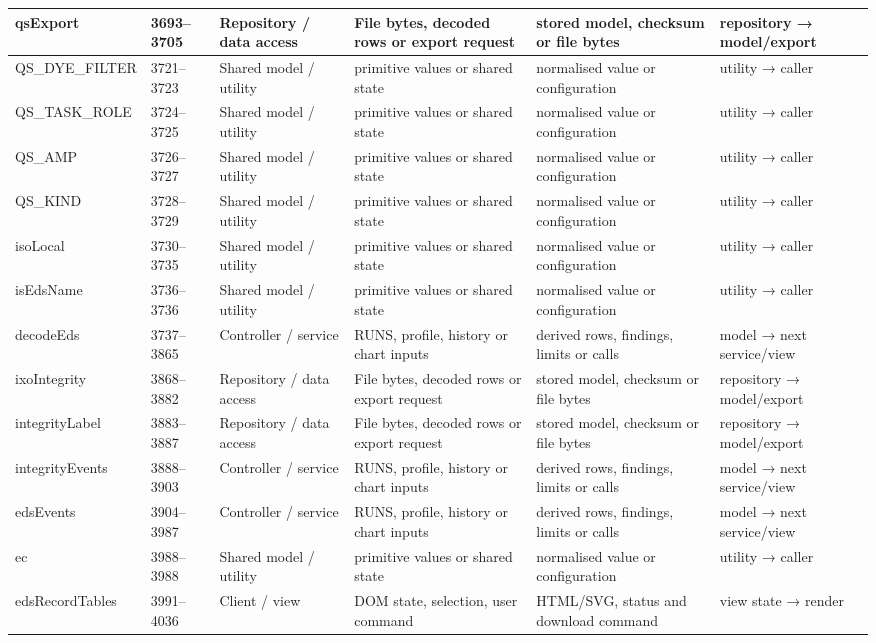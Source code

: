 \begin{landscape}
\begin{longtable}{@{}p{3.2cm}p{1.45cm}p{2.7cm}p{4.0cm}p{4.0cm}p{3.0cm}@{}}
qsExport & 3693--3705 & Repository / data access & File bytes, decoded rows or export request & stored model, checksum or file bytes & repository → model/export \\\hline
QS\_DYE\_FILTER & 3721--3723 & Shared model / utility & primitive values or shared state & normalised value or configuration & utility → caller \\\hline
QS\_TASK\_ROLE & 3724--3725 & Shared model / utility & primitive values or shared state & normalised value or configuration & utility → caller \\\hline
QS\_AMP & 3726--3727 & Shared model / utility & primitive values or shared state & normalised value or configuration & utility → caller \\\hline
QS\_KIND & 3728--3729 & Shared model / utility & primitive values or shared state & normalised value or configuration & utility → caller \\\hline
isoLocal & 3730--3735 & Shared model / utility & primitive values or shared state & normalised value or configuration & utility → caller \\\hline
isEdsName & 3736--3736 & Shared model / utility & primitive values or shared state & normalised value or configuration & utility → caller \\\hline
decodeEds & 3737--3865 & Controller / service & RUNS, profile, history or chart inputs & derived rows, findings, limits or calls & model → next service/view \\\hline
ixoIntegrity & 3868--3882 & Repository / data access & File bytes, decoded rows or export request & stored model, checksum or file bytes & repository → model/export \\\hline
integrityLabel & 3883--3887 & Repository / data access & File bytes, decoded rows or export request & stored model, checksum or file bytes & repository → model/export \\\hline
integrityEvents & 3888--3903 & Controller / service & RUNS, profile, history or chart inputs & derived rows, findings, limits or calls & model → next service/view \\\hline
edsEvents & 3904--3987 & Controller / service & RUNS, profile, history or chart inputs & derived rows, findings, limits or calls & model → next service/view \\\hline
ec & 3988--3988 & Shared model / utility & primitive values or shared state & normalised value or configuration & utility → caller \\\hline
edsRecordTables & 3991--4036 & Client / view & DOM state, selection, user command & HTML/SVG, status and download command & view state → render \\\hline

\end{longtable}
\end{landscape}
